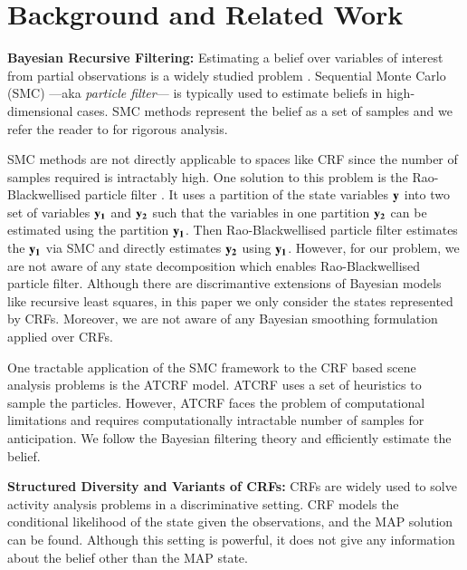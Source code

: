 \section{Background and Related Work}
\label{relwork}
\noindent
{\bf Bayesian Recursive Filtering:}
\label{parf}
Estimating a belief over variables of interest from partial observations is a widely studied problem \cite{thrunBook}. Sequential Monte Carlo (SMC) ---aka \emph{particle filter}--- is typically used to estimate beliefs in high-dimensional cases. SMC methods represent the belief as a set of samples and we refer the reader to \cite{meanFieldBook} for rigorous analysis.

SMC methods are not directly applicable to spaces like CRF since the number of samples required is intractably high. One solution to this problem is the Rao-Blackwellised particle filter \cite{raob}. It uses a partition of the state variables $\bf{y}$ into two set of variables $\bf{y}_1$ and $\bf{y}_2$ such that the variables in one partition $\bf{y}_2$ can be estimated using the partition $\bf{y}_1$. Then Rao-Blackwellised particle filter \cite{raob} estimates the $\bf{y}_1$ via SMC and directly estimates $\bf{y}_2$ using $\bf{y}_1$. However, for our problem, we are not aware of any state decomposition which enables Rao-Blackwellised particle filter. Although there are discrimantive extensions of Bayesian models like recursive least squares\cite{sarkka}, in this paper we only consider the states represented by CRFs. Moreover, we are not aware of any Bayesian smoothing formulation applied over CRFs.

One tractable application of the SMC framework to the CRF based scene analysis problems is the ATCRF \cite{hemaAnt} model. ATCRF \cite{hemaAnt} uses a set of heuristics to sample the particles. However, ATCRF faces the problem of computational limitations and requires computationally intractable number of samples for anticipation. We follow the Bayesian filtering theory and efficiently estimate the belief.

\noindent
{\bf Structured Diversity and Variants of CRFs:}
CRFs are widely used to solve activity analysis problems \cite{siminchi2005,quattoni2007} in a discriminative setting. CRF models the conditional likelihood of the state given the observations, and the MAP solution can be found. Although this setting is powerful, it does not give any information about the belief other than the MAP state.

